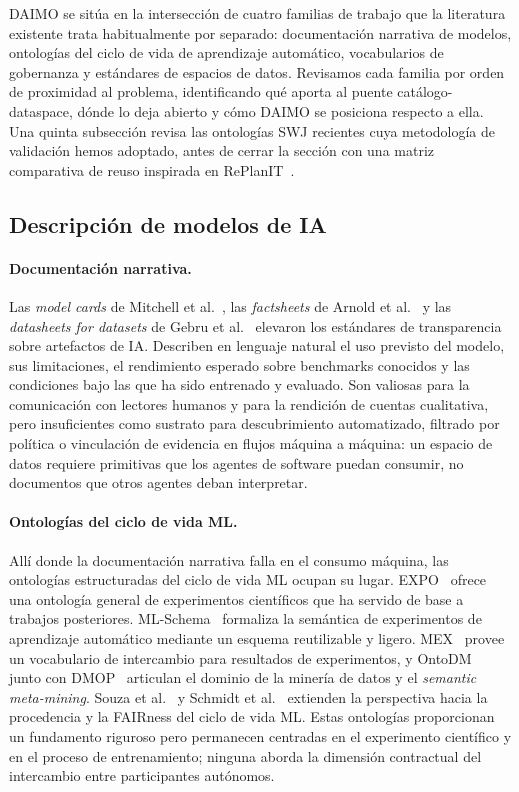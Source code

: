 \documentclass[Afour,sagev,times]{sagej}
\begin{document}
DAIMO se sitúa en la intersección de cuatro familias de trabajo que la literatura existente trata habitualmente por separado: documentación narrativa de modelos, ontologías del ciclo de vida de aprendizaje automático, vocabularios de gobernanza y estándares de espacios de datos. Revisamos cada familia por orden de proximidad al problema, identificando qué aporta al puente catálogo-dataspace, dónde lo deja abierto y cómo DAIMO se posiciona respecto a ella. Una quinta subsección revisa las ontologías SWJ recientes cuya metodología de validación hemos adoptado, antes de cerrar la sección con una matriz comparativa de reuso inspirada en RePlanIT~\cite{kurteva}.

\subsection{Descripción de modelos de IA}

\paragraph{Documentación narrativa.}

Las \emph{model cards} de Mitchell et al.~\cite{mitchell19}, las \emph{factsheets} de Arnold et al.~\cite{arnold19} y las \emph{datasheets for datasets} de Gebru et al.~\cite{gebru21} elevaron los estándares de transparencia sobre artefactos de IA. Describen en lenguaje natural el uso previsto del modelo, sus limitaciones, el rendimiento esperado sobre benchmarks conocidos y las condiciones bajo las que ha sido entrenado y evaluado. Son valiosas para la comunicación con lectores humanos y para la rendición de cuentas cualitativa, pero insuficientes como sustrato para descubrimiento automatizado, filtrado por política o vinculación de evidencia en flujos máquina a máquina: un espacio de datos requiere primitivas que los agentes de software puedan consumir, no documentos que otros agentes deban interpretar.

\paragraph{Ontologías del ciclo de vida ML.}

Allí donde la documentación narrativa falla en el consumo máquina, las ontologías estructuradas del ciclo de vida ML ocupan su lugar. EXPO~\cite{expo} ofrece una ontología general de experimentos científicos que ha servido de base a trabajos posteriores. ML-Schema~\cite{mls} formaliza la semántica de experimentos de aprendizaje automático mediante un esquema reutilizable y ligero. MEX~\cite{mex} provee un vocabulario de intercambio para resultados de experimentos, y OntoDM~\cite{ontodm} junto con DMOP~\cite{dmop} articulan el dominio de la minería de datos y el \emph{semantic meta-mining}. Souza et al.~\cite{souza19} y Schmidt et al.~\cite{schmidt21} extienden la perspectiva hacia la procedencia y la FAIRness del ciclo de vida ML. Estas ontologías proporcionan un fundamento riguroso pero permanecen centradas en el experimento científico y en el proceso de entrenamiento; ninguna aborda la dimensión contractual del intercambio entre participantes autónomos.
\end{document}
